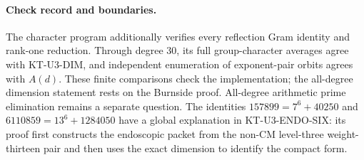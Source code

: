 \paragraph{Check record and boundaries.}
The character program additionally verifies every reflection Gram
identity and rank-one reduction. Through degree $30$, its full
group-character averages agree with KT-U3-DIM, and independent
enumeration of exponent-pair orbits agrees with $A(d)$.
These finite comparisons check the implementation; the all-degree
dimension statement rests on the Burnside proof.
All-degree arithmetic prime elimination remains a separate question.
The identities $157899=7^6+40250$ and
$6110859=13^6+1284050$ have a global explanation in
KT-U3-ENDO-SIX: its proof first constructs the endoscopic packet
from the non-CM level-three weight-thirteen pair and then uses
the exact dimension to identify the compact form.
